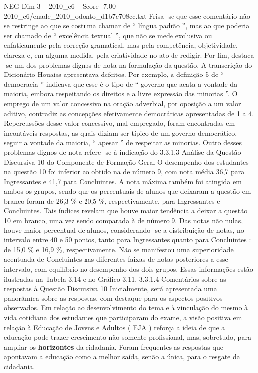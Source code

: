 \begin{textsample}{NEG Dim 3 – 2010\_c6 – Score -7.00 – 2010\_c6/enade\_2010\_odonto\_d1b7c708cc.txt}
Frisa -se que esse comentário não se restringe ao que se costuma chamar de “ língua padrão ”, mas ao que poderia ser chamado de “ excelência textual ”, que não se mede exclusiva ou enfaticamente pela correção gramatical, mas pela competência, objetividade, clareza e, em alguma medida, pela criatividade no ato de redigir.
Por fim, destaca -se um dos problemas dignos de nota na formulação da questão.
A transcrição do Dicionário Houaiss apresentava defeitos.
Por exemplo, a definição 5 de “ democracia ” indicava que esse é o tipo de “ governo que acata a vontade da maioria, embora respeitando os direitos e a livre expressão das minorias ”.
O emprego de um valor concessivo na oração adverbial, por oposição a um valor aditivo, contradiz as concepções efetivamente democráticas apresentadas de 1 a 4.
Repercussões desse valor concessivo, mal empregado, foram encontradas em incontáveis respostas, as quais diziam ser típico de um governo democrático, seguir a vontade da maioria, “ apesar ” de respeitar as minorias.
Outro desses problemas dignos de nota refere -se à indicação do 3.3.1.3 Análise da Questão Discursiva 10 do Componente de Formação Geral O desempenho dos estudantes na questão 10 foi inferior ao obtido na de número 9, com nota média 36,7 para Ingressantes e 41,7 para Concluintes.
A nota máxima também foi atingida em ambos os grupos, sendo que os percentuais de alunos que deixaram a questão em branco foram de 26,3 \% e 20,5 \%, respectivamente, para Ingressantes e Concluintes.
Tais índices revelam que houve maior tendência a deixar a questão 10 em branco, uma vez sendo comparada à de número 9.
Das notas não nulas, houve maior percentual de alunos, considerando -se a distribuição de notas, no intervalo entre 40 e 50 pontos, tanto para Ingressantes quanto para Concluintes : de 15,0 \% e 16,9 \%, respectivamente.
Não se manifestou uma superioridade acentuada de Concluintes nas diferentes faixas de notas posteriores a esse intervalo, com equilíbrio no desempenho dos dois grupos.
Essas informações estão ilustradas na Tabela 3.14 e no Gráfico 3.11. 3.3.1.4 Comentários sobre as respostas à Questão Discursiva 10 Inicialmente, será apresentada uma panorâmica sobre as respostas, com destaque para os aspectos positivos observados.
Em relação ao desenvolvimento do tema e à vinculação do mesmo à vida cotidiana dos estudantes que participaram do exame, a visão positiva em relação à Educação de Jovens e Adultos ( EJA ) reforça a ideia de que a educação pode trazer crescimento não somente profissional, mas, sobretudo, para ampliar os \textbf{horizontes} da cidadania.
Foram frequentes as respostas que apontavam a educação como a melhor saída, senão a única, para o resgate da cidadania.

\end{textsample}
